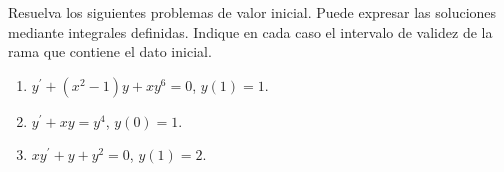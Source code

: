 Resuelva los siguientes problemas de valor inicial. Puede expresar las soluciones mediante integrales definidas. Indique en cada caso el intervalo de validez de la rama que contiene el dato inicial.

\begin{enumerate}[label=(\alph*),ref=\alph*,leftmargin=*]
\item $y^{\prime}+(x^2-1)y+xy^6=0$, $y(1)=1$.
\item $y^{\prime}+xy=y^4$, $y(0)=1$.
\item $xy^{\prime}+y+y^2=0$, $y(1)=2$.
\end{enumerate}
